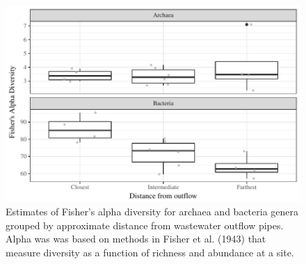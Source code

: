 \documentclass[letterpaper,12pt]{article}\usepackage[]{graphicx}\usepackage[]{color}
\makeatletter
\def\maxwidth{ %
  \ifdim\Gin@nat@width>\linewidth
    \linewidth
  \else
    \Gin@nat@width
  \fi
}
\newenvironment{knitrout}{}{} %
\makeatother
\begin{document}
\clearpage
\begin{knitrout}
\color{fgcolor}\begin{figure}[!ht]

{\centering \includegraphics[width=\maxwidth]{figs/boxdivcont} 

}

\caption[Estimates of Fisher's alpha diversity for archaea and bacteria genera grouped by approximate distance from wastewater outflow pipes]{Estimates of Fisher's alpha diversity for archaea and bacteria genera grouped by approximate distance from wastewater outflow pipes. Alpha was was based on methods in Fisher et al. (1943) that measure diversity as a function of richness and abundance at a site.}\label{fig:boxdivcont}
\end{figure}


\end{knitrout}
\end{document}
